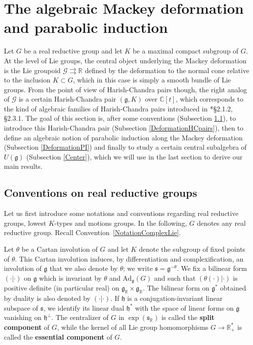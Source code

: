 \documentclass{amsart}
\theoremstyle{definition}
\begin{document}
\section{The algebraic Mackey deformation and parabolic induction}\label{sec2}

Let $G$ be a real reductive group and let $K$ be a maximal compact subgroup of $G$. At the level of Lie groups, the central object underlying the Mackey deformation is the Lie groupoid $\mathcal{G} \rightrightarrows \mathbb{R}$ defined by the deformation to the normal cone relative to the inclusion $K\subset G$, which in this case is simply a smooth bundle of Lie groups. From the point of view of Harish-Chandra pairs though, the right analog of $\mathcal{G}$ is a certain Harish-Chandra pair $(\bm{\mathfrak{g}},K)$ over $\mathbb{C}[t]$, which corresponds to the kind of algebraic families of Harish-Chandra pairs introduced in \cite{BHS}*{§2.1.2, §2.3.1}. The goal of this section is, after some conventions (Subsection \ref{DeformationConvention}), to introduce this Harish-Chandra pair (Subsection \ref{DeformationHCpairs}), then to define an algebraic notion of parabolic induction along the Mackey deformation (Subsection \ref{DeformationPI}) and finally to study a certain central subalgebra of $U(\bm{\mathfrak{g}})$ (Subsection \ref{Center}), which we will use in the last section to derive our main results.

\subsection{Conventions on real reductive groups}\label{DeformationConvention}

Let us first introduce some notations and conventions regarding real reductive groups, lowest $K$-types and motions groups. In the following, $G$ denotes any real reductive group. Recall Convention~\ref{NotationComplexLie}. 

Let $\theta$ be a Cartan involution of $G$ and let $K$ denote the subgroup of fixed points of $\theta$. This Cartan involution induces, by differentiation and complexification, an involution of $\mathfrak{g}$ that we also denote by $\theta$; we write $\mathfrak{s} = \mathfrak{g}^{-\theta}$. We fix a bilinear form $(\cdot |\cdot)$ on $\mathfrak{g}$ which is invariant by $\theta$ and $\mathrm{Ad}_{\mathfrak{g}}(G)$ and such that $(\theta(\cdot) |\cdot)$ is positive definite (in particular real) on $\mathfrak{g}_\mathbb{R} \times \mathfrak{g}_\mathbb{R}$. The bilinear form on $\mathfrak{g}^*$ obtained by duality is also denoted by $(\cdot |\cdot)$. If $\mathfrak{h}$ is a conjugation-invariant linear subspace of $\mathfrak{s}$, we identify its linear dual $\mathfrak{h}^*$ with the space of linear forms on $\mathfrak{g}$ vanishing on $\mathfrak{h}^\perp$. The centralizer of $G$ in $\exp(\mathfrak{s}_\mathbb{R})$ is called the \textbf{split component} of $G$, while the kernel of all Lie group homomorphisms $G \to \mathbb{R}_+^*$ is called the \textbf{essential component} of $G$.
\end{document}
